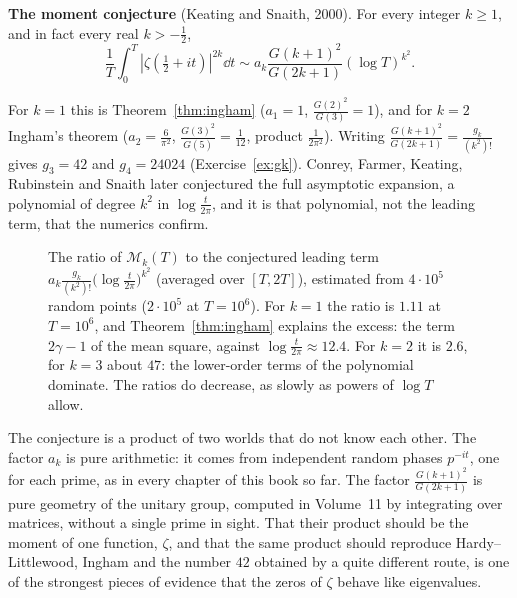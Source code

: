 \medskip\noindent\textbf{The moment conjecture} (Keating and Snaith, 2000). For every integer $k\ge1$, and in fact every real $k>-\frac12$,
\[
\frac1T\int_0^T|\zeta(\tfrac12+it)|^{2k}\dd t\sim a_k\frac{G(k+1)^2}{G(2k+1)}(\log T)^{k^2}.
\]

\medskip
For $k=1$ this is Theorem~\ref{thm:ingham} ($a_1=1$, $\frac{G(2)^2}{G(3)}=1$), and for $k=2$ Ingham's theorem ($a_2=\frac6{\pi^2}$, $\frac{G(3)^2}{G(5)}=\frac1{12}$, product $\frac1{2\pi^2}$). Writing $\frac{G(k+1)^2}{G(2k+1)}=\frac{g_k}{(k^2)!}$ gives $g_3=42$ and $g_4=24024$ (Exercise~\ref{ex:gk}). Conrey, Farmer, Keating, Rubinstein and Snaith later conjectured the full asymptotic expansion, a polynomial of degree $k^2$ in $\log\frac t{2\pi}$, and it is that polynomial, not the leading term, that the numerics confirm.

\begin{figure}[ht]
\centering{}
\caption{The ratio of $\mathcal M_k(T)$ to the conjectured leading term $a_k\frac{g_k}{(k^2)!}\bigl(\log\frac t{2\pi}\bigr)^{k^2}$ (averaged over $[T,2T]$), estimated from $4\cdot10^5$ random points ($2\cdot10^5$ at $T=10^6$). For $k=1$ the ratio is $1.11$ at $T=10^6$, and Theorem~\ref{thm:ingham} explains the excess: the term $2\gamma-1$ of the mean square, against $\log\frac t{2\pi}\approx12.4$. For $k=2$ it is $2.6$, for $k=3$ about $47$: the lower-order terms of the polynomial dominate. The ratios do decrease, as slowly as powers of $\log T$ allow.}
\label{fig:momentratios}
\end{figure}

\begin{beauty}
The conjecture is a product of two worlds that do not know each other. The factor $a_k$ is pure arithmetic: it comes from independent random phases $p^{-it}$, one for each prime, as in every chapter of this book so far. The factor $\frac{G(k+1)^2}{G(2k+1)}$ is pure geometry of the unitary group, computed in Volume~11 by integrating over matrices, without a single prime in sight. That their product should be the moment of one function, $\zeta$, and that the same product should reproduce Hardy--Littlewood, Ingham and the number $42$ obtained by a quite different route, is one of the strongest pieces of evidence that the zeros of $\zeta$ behave like eigenvalues.
\end{beauty}

